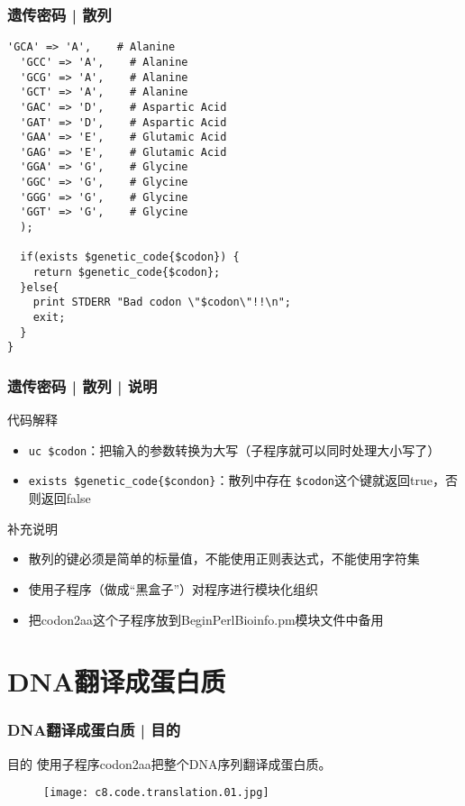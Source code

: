 \begin{frame}[fragile]
  \frametitle{遗传密码 | 散列}
\begin{lstlisting}[firstnumber=66,basicstyle=\footnotesize\tt,numberstyle=\scriptsize]
  'GCA' => 'A',    # Alanine
  'GCC' => 'A',    # Alanine
  'GCG' => 'A',    # Alanine
  'GCT' => 'A',    # Alanine
  'GAC' => 'D',    # Aspartic Acid
  'GAT' => 'D',    # Aspartic Acid
  'GAA' => 'E',    # Glutamic Acid
  'GAG' => 'E',    # Glutamic Acid
  'GGA' => 'G',    # Glycine
  'GGC' => 'G',    # Glycine
  'GGG' => 'G',    # Glycine
  'GGT' => 'G',    # Glycine
  );

  if(exists $genetic_code{$codon}) {
    return $genetic_code{$codon};
  }else{
    print STDERR "Bad codon \"$codon\"!!\n";
    exit;
  }
}
\end{lstlisting}
\end{frame}

\begin{frame}[fragile]
  \frametitle{遗传密码 | 散列 | \alert{说明}}
  \begin{block}{代码解释}
  \begin{itemize}
    \item \verb|uc $codon|：把输入的参数转换为大写（子程序就可以同时处理大小写了）
    \item \verb|exists $genetic_code{$condon}|：散列中存在 \verb|$codon|这个键就返回true，否则返回false
  \end{itemize}
  \end{block}
  \pause
  \begin{block}{补充说明}
    \begin{itemize}
      \item 散列的键必须是简单的标量值，不能使用正则表达式，不能使用字符集
      \item 使用子程序（做成“黑盒子”）对程序进行模块化组织
      \item 把codon2aa这个子程序放到BeginPerlBioinfo.pm模块文件中备用
    \end{itemize}
  \end{block}
\end{frame}

\section{DNA翻译成蛋白质}
\begin{frame}
  \frametitle{DNA翻译成蛋白质 | 目的}
  \begin{block}{目的}
    使用子程序codon2aa把整个DNA序列翻译成蛋白质。
  \end{block}
  \begin{figure}
    \centering
    \texttt{[image: c8.code.translation.01.jpg]}
  \end{figure}
\end{frame}

